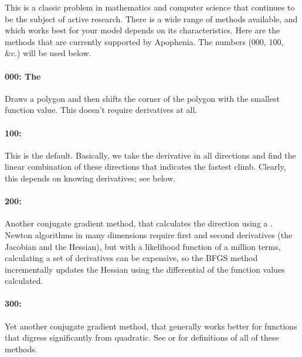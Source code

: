 This is a classic problem in mathematics and computer science that
continues to be the subject of active research. There is a wide range of
methods available, and which works best for your model depends on its
characteristics. Here are the methods
that are currently supported by Apophenia. The numbers (000, 100, \&c.)
will be used below.

\paragraph{000: The } Draws a polygon and
then shifts the corner of the polygon with the smallest function value.
This doesn't require derivatives at all.

\paragraph{100: } This is the
default. Basically, we take the derivative in all directions and find
the linear combination of these directions that indicates the fastest
climb. Clearly, this depends on knowing derivatives; see below.

\paragraph{200: }  Another conjugate gradient method, that calculates the
direction using a . Newton algorithms
in many dimensions require first and second derivatives (the Jacobian
and the Hessian), but with a likelihood function of a million terms,
calculating a set of derivatives can be expensive, so the BFGS method
incrementally updates the Hessian using the differential of the function
values calculated.

\paragraph{300: } Yet another
conjugate gradient method, that generally works better for functions
that digress significantly from quadratic.  See \citet[thorough, mathematician audience]{avriel:nonlinear}
or \citet[practical, modeling audience]{practical:optimization}  for definitions of all of these methods.

